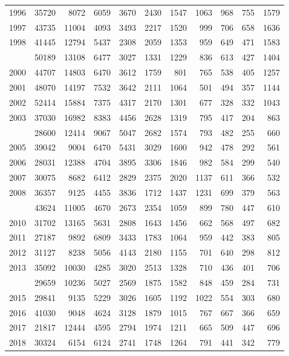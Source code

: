 \documentclass[
]{article}
\begin{document}
\begin{longtable}[t]{lrrrrrrrrrr}
1996 & 35720 & 8072 & 6059 & 3670 & 2430 & 1547 & 1063 & 968 & 755 & 1579\\
1997 & 43735 & 11004 & 4093 & 3493 & 2217 & 1520 & 999 & 706 & 658 & 1636\\
1998 & 41445 & 12794 & 5437 & 2308 & 2059 & 1353 & 959 & 649 & 471 & 1583\\
\addlinespace
1999 & 50189 & 13108 & 6477 & 3027 & 1331 & 1229 & 836 & 613 & 427 & 1404\\
2000 & 44707 & 14803 & 6470 & 3612 & 1759 & 801 & 765 & 538 & 405 & 1257\\
2001 & 48070 & 14197 & 7532 & 3642 & 2111 & 1064 & 501 & 494 & 357 & 1144\\
2002 & 52414 & 15884 & 7375 & 4317 & 2170 & 1301 & 677 & 328 & 332 & 1043\\
2003 & 37030 & 16982 & 8383 & 4456 & 2628 & 1319 & 795 & 417 & 204 & 863\\
\addlinespace
2004 & 28600 & 12414 & 9067 & 5047 & 2682 & 1574 & 793 & 482 & 255 & 660\\
2005 & 39042 & 9004 & 6470 & 5431 & 3029 & 1600 & 942 & 478 & 292 & 561\\
2006 & 28031 & 12388 & 4704 & 3895 & 3306 & 1846 & 982 & 584 & 299 & 540\\
2007 & 30075 & 8682 & 6412 & 2829 & 2375 & 2020 & 1137 & 611 & 366 & 532\\
2008 & 36357 & 9125 & 4455 & 3836 & 1712 & 1437 & 1231 & 699 & 379 & 563\\
\addlinespace
2009 & 43624 & 11005 & 4670 & 2673 & 2354 & 1059 & 899 & 780 & 447 & 610\\
2010 & 31702 & 13165 & 5631 & 2808 & 1643 & 1456 & 662 & 568 & 497 & 682\\
2011 & 27187 & 9892 & 6809 & 3433 & 1783 & 1064 & 959 & 442 & 383 & 805\\
2012 & 31127 & 8238 & 5056 & 4143 & 2180 & 1155 & 701 & 640 & 298 & 812\\
2013 & 35092 & 10030 & 4285 & 3020 & 2513 & 1328 & 710 & 436 & 401 & 706\\
\addlinespace
2014 & 29659 & 10236 & 5027 & 2569 & 1875 & 1582 & 848 & 459 & 284 & 731\\
2015 & 29841 & 9135 & 5229 & 3026 & 1605 & 1192 & 1022 & 554 & 303 & 680\\
2016 & 41030 & 9048 & 4624 & 3128 & 1879 & 1015 & 767 & 667 & 366 & 659\\
2017 & 21817 & 12444 & 4595 & 2794 & 1974 & 1211 & 665 & 509 & 447 & 696\\
2018 & 30324 & 6154 & 6124 & 2741 & 1748 & 1264 & 791 & 441 & 342 & 779\\

\end{longtable}
\end{document}
